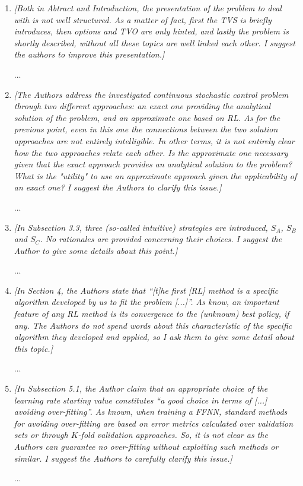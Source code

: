 \documentclass{article}
\begin{document}
\begin{enumerate}

 \item \textit{[Both in Abtract and Introduction, the presentation of the problem to deal with is not well structured. As a matter of fact, first the TVS is briefly introduces, then options and TVO are only hinted, and lastly the problem is shortly described, without all these topics are well linked each other. I suggest the authors to improve this presentation.]}

 ...

 \item \textit{[The Authors address the investigated continuous stochastic control problem through two different approaches: an exact one providing the analytical solution of the problem, and an approximate one based on RL. As for the previous point, even in this one the connections between the two solution approaches are not entirely intelligible. In other terms, it is not entirely clear how the two approaches relate each other. Is the approximate one necessary given that the exact approach provides an analytical solution to the problem? What is the "utility" to use an approximate approach given the applicability of an exact one? I suggest the Authors to clarify this issue.]} 
 
 ...
 
 \item \textit{[In Subsection 3.3, three (so-called intuitive) strategies are introduced, $S_A$, $S_B$ and $S_C$. No rationales are provided concerning their choices. I suggest the Author to give some details about this point.]} 
 
 ...
 
 \item \textit{[In Section 4, the Authors state that ``[t]he first [RL] method is a specific algorithm developed by us to fit the problem [...]''. As know, an important feature of any RL method is its convergence to the (unknown) best policy, if any. The Authors do not spend words about this characteristic of the specific algorithm they developed and applied, so I ask them to give some detail about this topic.]} 
 
 ...

 \item \textit{[In Subsection 5.1, the Author claim that an appropriate choice of the learning rate starting value constitutes ``a good choice in terms of [...] avoiding over-fitting''. As known, when training a FFNN, standard methods for avoiding over-fitting are based on error metrics calculated over validation sets or through $K$-fold validation approaches. So, it is not clear as the Authors can guarantee no over-fitting without exploiting such methods or similar. I suggest the Authors to carefully clarify this issue.]} 
 
 ...

 \end{enumerate}
\end{document}
